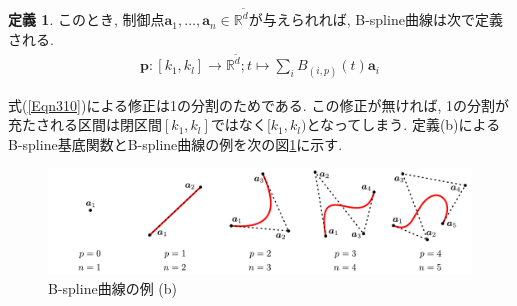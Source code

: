 \documentclass{jsarticle}
\newcommand\setR{\mathbb{R}}
\theoremstyle{definition}%
\newtheorem{defn}[thm]{定義}
\begin{document}
\begin{screen}
\begin{defn}
        このとき, 制御点$\bm{a}_1, \dots, \bm{a}_n\in \setR^{\tilde{d}}$が与えられれば, B-spline曲線は次で定義される.
		\begin{align}
			\bm{p}:[k_{1},k_{l}]\to \setR^{\tilde{d}};t\mapsto\sum_i B_{(i,p)}(t) \bm{a}_i
		\end{align}
	\end{defn}
\end{screen}
式(\ref{Eqn310})による修正は1の分割のためである.
この修正が無ければ, 1の分割が充たされる区間は閉区間$[k_1,k_l]$ではなく$[k_1,k_l)$となってしまう.
定義(b)によるB-spline基底関数とB-spline曲線の例を次の図\ref{Fig300b}に示す.
\addtocounter{footnote}{-1}
\begin{figure}[H]
	\centering
    \includegraphics[page=16,clip,width=160mm]{fig.pdf}
    \caption{B-spline曲線の例 (b)\protect\footnotemark}
	\label{Fig300b}
\end{figure}
\end{document}
